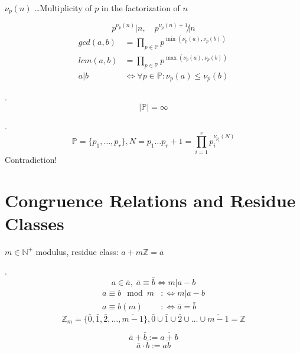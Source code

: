 $\nu_p(n)$ \ldots Multiplicity of $p$ in the factorization of $n$

\[
  p^{\nu_p(n)} | n, \quad p^{\nu_p(n)+1} \not| n
\]
\begin{align*}
  gcd(a,b) &= \prod_{p \in \mathbb{P}} p ^{\min(\nu_p(a), \nu_p(b))} \\
  lcm(a,b) &= \prod_{p \in \mathbb{P}} p ^{\max(\nu_p(a), \nu_p(b))} \\
  a|b &\iff \forall p \in \mathbb{P} : \nu_p(a) \leq \nu_p(b)
\end{align*}

\Theorem.
\[
  | \mathbb{P} | = \infty
\]

\Proof.
\[
  \mathbb{P} = \{p_1, \ldots , p_r\}, N = p_1 \ldots p_r + 1 = \prod_{i=1}^r p_i^{\nu_{p_i}(N)}
\]
Contradiction!

\section{Congruence Relations and Residue Classes}

\begin{definition}
$m \in \mathbb{N}^{+}$ modulus,
residue class: $a+m \mathbb{Z} = \bar{a}$
\end{definition}

\Remark.
\[
  a\in \bar{a},\; \bar{a} \equiv \bar{b} \iff m | a-b
\]
\begin{align*}
  a \equiv b \mod m & :\iff m | a-b \\
  a \equiv b (m)     & :\iff \bar{a} = \bar{b}
\end{align*}
\[
  \mathbb{Z}_m = \{ \bar{0},\bar{1},\bar{2}, \ldots, \overline{m-1}\} ,
  \bar{0} \cup \bar{1} \cup \bar{2} \cup  \ldots \cup \overline{m-1} = \mathbb{Z}
\]


\begin{definition}
\[
  \bar{a} + \bar{b} := \overline{a+b}
\]
\[
  \bar{a} \cdot \bar{b} := \overline{ab}
\]
\end{definition}

